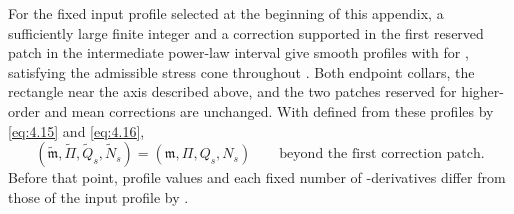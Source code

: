 \begin{proposition}\label{prop:C.2}
For the fixed input profile  selected at the beginning of this appendix,
a sufficiently large finite integer  and a correction supported in the first reserved patch in the
intermediate power-law interval give smooth profiles  with
 for , satisfying
the admissible stress cone throughout . Both endpoint collars, the rectangle near the axis
described above, and the two patches reserved for higher-order and mean corrections are unchanged.
With  defined from these profiles by \eqref{eq:4.15} and \eqref{eq:4.16},
\[
 (\widetilde{\mathfrak m},\widetilde\Pi,\widetilde Q_s,\widetilde N_s)
 =(\mathfrak m,\Pi,Q_s,N_s)
 \qquad\text{beyond the first correction patch}.
\]
Before that point, profile values and each fixed number of -derivatives differ from those of the input
profile by .
\end{proposition}

